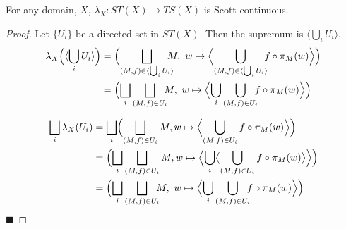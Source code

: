\begin{proposition}
For any domain, $X$, $\lambda_X:ST(X)\to TS(X)$ is Scott continuous.
\end{proposition}
\begin{proof}
Let $\{U_i\}$ be a directed set in $ST(X)$.  Then the supremum is $\langle\bigcup_i U_i\rangle$.
\begin{align*}
\lambda_X\Bigl(\langle\bigcup_i U_i\rangle\Bigr) &= \Bigl(\bigsqcup_{(M,f)\in \langle\bigcup_i U_i\rangle} \!\!\!\!\!M,\ w\mapsto \Bigl\langle\bigcup_{(M,f)\in \langle\bigcup_i U_i\rangle}\!\!\! f\circ \pi_M(w)\Bigr\rangle\Bigr) \\ 
&= \Bigl(\bigsqcup_i \bigsqcup_{(M,f)\in U_i} \!\!\!M,\ w\mapsto \Bigl\langle\bigcup_i \bigcup_{(M,f)\in U_i}\!\!\! f\circ \pi_M(w)\Bigr\rangle\Bigr)
\end{align*}

\begin{align*}
\bigsqcup_i \lambda_X(U_i) &= \bigsqcup_i \Bigl(\bigsqcup_{(M,f)\in U_i} M, w\mapsto\Bigl\langle\bigcup_{(M,f)\in U_i} f\circ \pi_M(w)\Bigr\rangle\Bigr) \\
&= \Bigl(\bigsqcup_i \bigsqcup_{(M,f)\in U_i} M, w\mapsto\Bigl\langle\bigcup_i \bigl\langle\bigcup_{(M,f)\in U_i} f\circ \pi_M(w)\bigr\rangle\Bigr\rangle\Bigr) \\
&= \Bigl(\bigsqcup_i \bigsqcup_{(M,f)\in U_i} \!\!\!M,\ w\mapsto \Bigl\langle\bigcup_i \bigcup_{(M,f)\in U_i}\!\!\! f\circ \pi_M(w)\Bigr\rangle\Bigr)
\end{align*}
\hfill $\blacksquare$
\end{proof}

